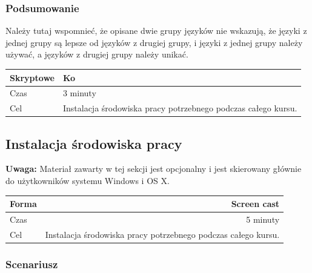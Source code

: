 \documentclass{mwart}
\begin{document}
\subsubsection{Podsumowanie}
Należy tutaj wspomnieć, że opisane dwie grupy języków nie wskazują, że języki z jednej
grupy są lepsze od języków z drugiej grupy, i języki z jednej grupy należy używać, a
języków z drugiej grupy należy unikać.

\begin{center}
  \begin{tabular}{ll}
    \toprule
    Skryptowe & Ko \\
    \midrule
    Czas & 3 minuty \\
    Cel & Instalacja środowiska pracy potrzebnego podczas całego kursu. \\
    \bottomrule
  \end{tabular}
\end{center}


\subsection{Instalacja środowiska pracy}

\textbf{Uwaga:} Materiał zawarty w tej sekcji jest opcjonalny i jest skierowany głównie do użytkowników systemu
Windows i OS X.
\begin{center}
  \begin{tabular}{lr}
    \toprule
    Forma & Screen cast \\
    \midrule
    Czas & 5 minuty \\
    Cel & Instalacja środowiska pracy potrzebnego podczas całego kursu. \\
    \bottomrule
  \end{tabular}
\end{center}

\subsubsection{Scenariusz}
\end{document}

